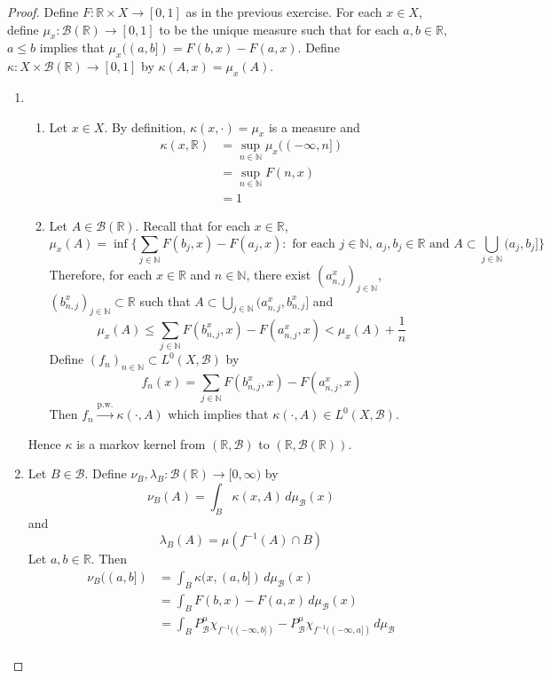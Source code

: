 \documentclass{book}
\theoremstyle{definition}
\newcommand{\kap}{\kappa}
\newcommand{\lam}{\lambda}
\newcommand{\N}{\mathbb{N}}
\newcommand{\R}{\mathbb{R}}
\newcommand{\MB}{\mathcal{B}}
\DeclareMathOperator*{\0}{\mbf{0}}
\DeclareMathOperator*{\1}{\mbf{1}}
\newcommand{\convt}[1]{\xrightarrow{\text{#1}}}
\newcommand{\Rg}{[0,\infty)}
\newcommand{\dmu}{\, d \mu}
\begin{document}
	\begin{proof} Define $F:\R \times X \rightarrow [0,1]$ as in the previous exercise. For each $x \in X$, define $\mu_x: \MB(\R) \rightarrow [0,1]$ to be the unique measure such that for each $a, b \in \R$, $a \leq b$ implies that $\mu_x((a,b]) = F(b, x) - F(a, x)$. Define $\kap: X \times \MB(\R) \rightarrow [0,1]$ by $\kap(A, x) = \mu_x(A)$. \\
		\begin{enumerate}
			\item \
			\begin{enumerate}
				\item Let $x \in X$. By definition, $\kap(x, \cdot) = \mu_x$ is a measure and 
				\begin{align*}
					\kap(x, \R) 
					& = \sup_{n \in \N} \mu_x((-\infty, n])\\
					& = \sup_{n \in \N} F(n, x) \\
					& = 1 
				\end{align*}
				\item Let $A \in \MB(\R)$. Recall that for each $x \in \R$,
				$$\mu_x(A) = \inf \bigg \{ \sum\limits_{j \in \N} F(b_j, x) - F(a_j, x): \text{ for each $j \in \N$, $a_j, b_j \in \R$ and } A \subset \bigcup\limits_{j \in \N} (a_j, b_j] \bigg \}$$ 
				Therefore, for each $x \in \R$ and $n \in \N$, there exist $(a^x_{n,j})_{j \in \N}$, $(b^x_{n,j})_{j \in \N} \subset \R$ such that $A \subset \bigcup\limits_{j \in \N} (a^x_{n,j}, b^x_{n,j}]$ and 
				$$\mu_x(A) \leq \sum\limits_{j \in \N} F(b^x_{n,j}, x) - F(a^x_{n,j}, x) < \mu_x(A) + \frac{1}{n}$$
				Define $(f_n)_{n \in \N} \subset L^0(X, \MB)$ by $$f_n(x) = \sum\limits_{j \in \N} F(b^x_{n,j}, x) - F(a^x_{n,j}, x)$$
				Then $f_n \convt{p.w.} \kap(\cdot, A)$ which implies that $\kap(\cdot, A) \in L^0(X, \MB)$. 
			\end{enumerate}
			Hence $\kap$ is a markov kernel from $(\R, \MB)$ to $(\R, \MB(\R))$.\\
			\item Let $B \in \MB$. Define $\nu_B, \lam_{B}:\MB(\R) \rightarrow \Rg$ by 
			$$\nu_B(A) = \int_B \kap(x, A) \dmu_{\MB}(x)$$ 
			and
			$$\lam_B(A) = \mu(f^{-1}(A) \cap B)$$ 
			Let $a,b \in \R$. Then 
			\begin{align*}
				\nu_B((a,b]) 
				& = \int_B \kap(x, (a,b]) \dmu_{\MB}(x) \\
				& = \int_{B} F(b, x) - F(a,x) \dmu_{\MB}(x) \\
				& = \int_{B} P^{\mu}_{\MB}\chi_{f^{-1}((-\infty, b])} - P^{\mu}_{\MB}\chi_{f^{-1}((-\infty, a])} \dmu_{\MB} \\

\end{align*}
\end{enumerate}
\end{proof}
\end{document}
